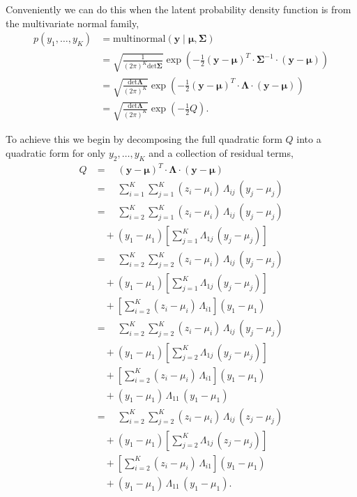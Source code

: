 \documentclass[
  letterpaper,
  DIV=11,
  numbers=noendperiod]{scrartcl}
\begin{document}
Conveniently we can do this when the latent probability density function
is from the multivariate normal family, \begin{align*}
p(y_{1}, \ldots, y_{K})
&=
\text{multinormal}( \mathbf{y} \mid \boldsymbol{\mu}, \boldsymbol{\Sigma} )
\\
&=
\sqrt{ \frac{1}{ (2 \pi)^{K} \mathrm{det} \boldsymbol{\Sigma} } }
\exp \left( -\frac{1}{2}
( \mathbf{y} - \boldsymbol{\mu} )^{T} \cdot
\boldsymbol{\Sigma}^{-1} \cdot
( \mathbf{y} - \boldsymbol{\mu})
\right)
\\
&=
\sqrt{ \frac{\mathrm{det} \boldsymbol{\Lambda}}{ (2 \pi)^{K} } }
\exp \left( -\frac{1}{2}
( \mathbf{y} - \boldsymbol{\mu} )^{T} \cdot
\boldsymbol{\Lambda} \cdot
( \mathbf{y} - \boldsymbol{\mu})
\right)
\\
&=
\sqrt{ \frac{\mathrm{det} \boldsymbol{\Lambda}}{ (2 \pi)^{K} } }
\exp \left( -\frac{1}{2} Q \right).
\end{align*}

To achieve this we begin by decomposing the full quadratic form \(Q\)
into a quadratic form for only \(y_{2}, \ldots, y_{K}\) and a collection
of residual terms, \begin{align*}
Q
&=\quad
( \mathbf{y} - \boldsymbol{\mu} )^{T} \cdot
\boldsymbol{\Lambda} \cdot
 ( \mathbf{y} - \boldsymbol{\mu})
\\
&=\quad
\sum_{i = 1}^{K} \sum_{j = 1}^{K}
(z_{i} - \mu_{i}) \, \Lambda_{ij} \, (y_{j} - \mu_{j})
\\
&=\quad
\sum_{i = 2}^{K} \sum_{j = 1}^{K}
(z_{i} - \mu_{i}) \, \Lambda_{ij} \, (y_{j} - \mu_{j})
\\
&\quad +
(y_{1} - \mu_{1})
\left[ \sum_{j = 1}^{K} \Lambda_{1j} \, (y_{j} - \mu_{j}) \right]
\\
&=\quad
\sum_{i = 2}^{K} \sum_{j = 2}^{K}
(z_{i} - \mu_{i}) \, \Lambda_{ij} \, (y_{j} - \mu_{j})
\\
&\quad+
(y_{1} - \mu_{1})
\left[ \sum_{j = 1}^{K} \Lambda_{1j} \, (y_{j} - \mu_{j}) \right]
\\
&\quad+
\left[ \sum_{i = 2}^{K} (z_{i} - \mu_{i}) \, \Lambda_{i1} \right]
(y_{1} - \mu_{1})
\\
&=\quad
\sum_{i = 2}^{K} \sum_{j = 2}^{K}
(z_{i} - \mu_{i}) \, \Lambda_{ij} \, (y_{j} - \mu_{j})
\\
&\quad+
(y_{1} - \mu_{1})
\left[ \sum_{j = 2}^{K} \Lambda_{1j} \, (y_{j} - \mu_{j}) \right]
\\
&\quad+
\left[ \sum_{i = 2}^{K} (z_{i} - \mu_{i}) \, \Lambda_{i1} \right]
(y_{1} - \mu_{1})
\\
&\quad+
(y_{1} - \mu_{1}) \, \Lambda_{11} \, (y_{1} - \mu_{1})
\\
&=\quad
\sum_{i = 2}^{K} \sum_{j = 2}^{K} (z_{i} - \mu_{i}) \,
\Lambda_{ij} \, (z_{j} - \mu_{j})
\\
&\quad+
(y_{1} - \mu_{1})
\left[ \sum_{j = 2}^{K} \Lambda_{1j} \, (z_{j} - \mu_{j}) \right]
\\
&\quad+
\left[ \sum_{i = 2}^{K} (z_{i} - \mu_{i}) \, \Lambda_{i1} \right]
(y_{1} - \mu_{1})
\\
&\quad+
(y_{1} - \mu_{1}) \, \Lambda_{11} \, (y_{1} - \mu_{1}).
\end{align*}
\end{document}
